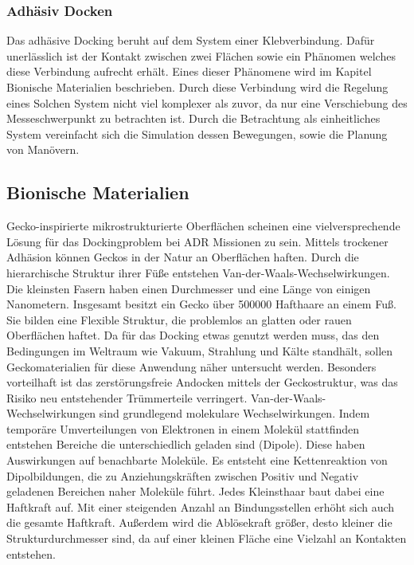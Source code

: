 \subsubsection{Adhäsiv Docken}

	Das adhäsive Docking beruht auf dem System einer Klebverbindung. Dafür unerlässlich ist der Kontakt zwischen zwei Flächen sowie ein Phänomen welches diese Verbindung aufrecht erhält. Eines dieser Phänomene wird im Kapitel Bionische Materialien beschrieben. Durch diese Verbindung wird die Regelung eines Solchen System nicht viel komplexer als zuvor, da nur eine Verschiebung des Messeschwerpunkt zu betrachten ist. Durch die Betrachtung als einheitliches System vereinfacht sich die Simulation dessen Bewegungen, sowie die Planung von Manövern.     
						
		
		
		\subsection{Bionische Materialien}%
	
	Gecko-inspirierte mikrostrukturierte Oberflächen scheinen eine vielversprechende Lösung für das Dockingproblem bei ADR Missionen zu sein. Mittels trockener Adhäsion können Geckos in der Natur an Oberflächen haften. Durch die hierarchische Struktur ihrer Füße entstehen Van-der-Waals-Wechselwirkungen. Die kleinsten Fasern haben einen Durchmesser und eine Länge von einigen Nanometern. Insgesamt besitzt ein Gecko über 500000 Hafthaare an einem Fuß. Sie bilden eine Flexible Struktur, die problemlos an glatten oder rauen Oberflächen haftet. Da für das Docking etwas genutzt werden muss, das den Bedingungen im Weltraum wie Vakuum, Strahlung und Kälte standhält, sollen Geckomaterialien für diese Anwendung näher untersucht werden. Besonders vorteilhaft ist das zerstörungsfreie Andocken mittels der Geckostruktur, was das Risiko neu entstehender Trümmerteile verringert. Van-der-Waals-Wechselwirkungen sind grundlegend molekulare Wechselwirkungen. Indem temporäre Umverteilungen von Elektronen in einem Molekül stattfinden entstehen Bereiche die unterschiedlich geladen sind (Dipole). Diese haben Auswirkungen auf benachbarte Moleküle. Es entsteht eine Kettenreaktion von Dipolbildungen, die zu Anziehungskräften zwischen Positiv und Negativ geladenen Bereichen naher Moleküle führt. Jedes Kleinsthaar baut dabei eine Haftkraft auf. Mit einer steigenden Anzahl an Bindungsstellen erhöht sich auch die gesamte Haftkraft. Außerdem wird die Ablösekraft größer, desto kleiner die Strukturdurchmesser sind, da auf einer kleinen Fläche eine Vielzahl an Kontakten entstehen.\cite{Schwerter.}
	

